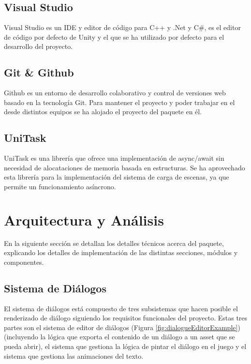\subsection{Visual Studio}

Visual Studio\cite{visualstudio} es un IDE y editor de código para C++ y .Net y C\#, es el editor de código por defecto de Unity y el que se ha utilizado por defecto para el desarrollo del proyecto. 

\subsection{Git \& Github}

Github\cite{github} es un entorno de desarrollo colaborativo y control de versiones web basado en la tecnología Git. Para mantener el proyecto y poder trabajar en 
el desde distintos equipos se ha alojado el proyecto del paquete\cite{Repo} en él.

\subsection{UniTask}

UniTask\cite{UniTask} es una librería que ofrece una implementación de async/await sin necesidad de alocataciones de memoria basada en estructuras. Se ha aprovechado esta librería para la implementación del sistema de carga de escenas, ya que permite
 un funcionamiento asíncrono.

\section{Arquitectura y Análisis}
En la siguiente sección se detallan los detalles técnicos acerca del paquete, explicando los detalles de implementación de las distintas secciones, módulos y componentes.

\subsection{Sistema de Diálogos}
El sistema de diálogos está compuesto de tres subsistemas que hacen posible el renderizado de diálogo siguiendo los requisitos funcionales del proyecto. Estas tres partes son
el sistema de editor de diálogos (Figura \ref{fig:dialogueEditorExample}) (incluyendo la lógica que exporta el contenido de un diálogo a un asset que se pueda abrir), el sistema que gestiona la lógica de pintar el 
diálogo en el juego y el sistema que gestiona las animaciones del texto.

